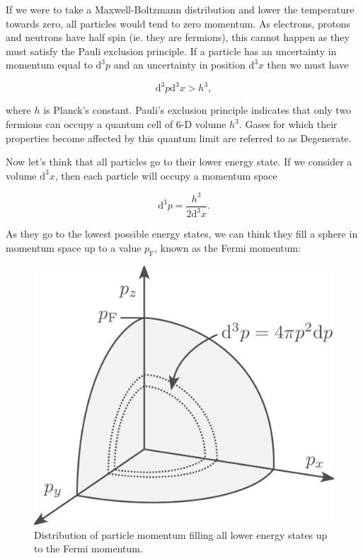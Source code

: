 \documentclass[twocolumn]{article}
\begin{document}
If we were to take a Maxwell-Boltzmann distribution and lower the
temperature towards zero, all particles would tend to zero momentum. As
electrons, protons and neutrons have half spin (ie. they are fermions),
this cannot happen as they must satisfy the Pauli exclusion principle.
If a particle has an uncertainty in momentum equal to \(\mathrm{d}^3 p\)
and an uncertainty in position \(\mathrm{d}^3 x\) then we must have

\[\mathrm{d}^3 p\mathrm{d}^3x>h^3,\]

where \(h\) is Planck's constant. Pauli's exclusion principle indicates
that only two fermions can occupy a quantum cell of 6-D volume \(h^3\).
Gases for which their properties become affected by this quantum limit
are referred to as Degenerate.

Now let's think that all particles go to their lower energy state. If we
consider a volume \(\mathrm{d}^3x\), then each particle will occupy a
momentum space

\[\mathrm{d}^3p=\frac{h^3}{2\mathrm{d}^3 x}.\]

As they go to the lowest possible energy states, we can think they fill
a sphere in momentum space up to a value \(p_\mathrm{F}\), known as the
Fermi momentum:

\begin{figure}
\centering
\includegraphics{../assets/4_eos2/momentum.pdf}
\caption{Distribution of particle momentum filling all lower energy
states up to the Fermi momentum.}
\end{figure}
\end{document}
